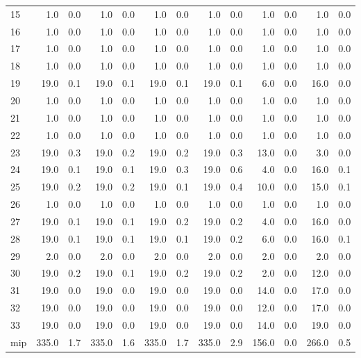\begin{tabular}{lrrrrrrrrrrrr}
     15 &   1.0 &   0.0 &   1.0 &     0.0 &   1.0 &     0.0 &   1.0 &     0.0 &   1.0 &     0.0 &   1.0 &     0.0 \\
     16 &   1.0 &   0.0 &   1.0 &     0.0 &   1.0 &     0.0 &   1.0 &     0.0 &   1.0 &     0.0 &   1.0 &     0.0 \\
     17 &   1.0 &   0.0 &   1.0 &     0.0 &   1.0 &     0.0 &   1.0 &     0.0 &   1.0 &     0.0 &   1.0 &     0.0 \\
     18 &   1.0 &   0.0 &   1.0 &     0.0 &   1.0 &     0.0 &   1.0 &     0.0 &   1.0 &     0.0 &   1.0 &     0.0 \\
     19 &  19.0 &   0.1 &  19.0 &     0.1 &  19.0 &     0.1 &  19.0 &     0.1 &   6.0 &     0.0 &  16.0 &     0.0 \\
     20 &   1.0 &   0.0 &   1.0 &     0.0 &   1.0 &     0.0 &   1.0 &     0.0 &   1.0 &     0.0 &   1.0 &     0.0 \\
     21 &   1.0 &   0.0 &   1.0 &     0.0 &   1.0 &     0.0 &   1.0 &     0.0 &   1.0 &     0.0 &   1.0 &     0.0 \\
     22 &   1.0 &   0.0 &   1.0 &     0.0 &   1.0 &     0.0 &   1.0 &     0.0 &   1.0 &     0.0 &   1.0 &     0.0 \\
     23 &  19.0 &   0.3 &  19.0 &     0.2 &  19.0 &     0.2 &  19.0 &     0.3 &  13.0 &     0.0 &   3.0 &     0.0 \\
     24 &  19.0 &   0.1 &  19.0 &     0.1 &  19.0 &     0.3 &  19.0 &     0.6 &   4.0 &     0.0 &  16.0 &     0.1 \\
     25 &  19.0 &   0.2 &  19.0 &     0.2 &  19.0 &     0.1 &  19.0 &     0.4 &  10.0 &     0.0 &  15.0 &     0.1 \\
     26 &   1.0 &   0.0 &   1.0 &     0.0 &   1.0 &     0.0 &   1.0 &     0.0 &   1.0 &     0.0 &   1.0 &     0.0 \\
     27 &  19.0 &   0.1 &  19.0 &     0.1 &  19.0 &     0.2 &  19.0 &     0.2 &   4.0 &     0.0 &  16.0 &     0.0 \\
     28 &  19.0 &   0.1 &  19.0 &     0.1 &  19.0 &     0.1 &  19.0 &     0.2 &   6.0 &     0.0 &  16.0 &     0.1 \\
     29 &   2.0 &   0.0 &   2.0 &     0.0 &   2.0 &     0.0 &   2.0 &     0.0 &   2.0 &     0.0 &   2.0 &     0.0 \\
     30 &  19.0 &   0.2 &  19.0 &     0.1 &  19.0 &     0.2 &  19.0 &     0.2 &   2.0 &     0.0 &  12.0 &     0.0 \\
     31 &  19.0 &   0.0 &  19.0 &     0.0 &  19.0 &     0.0 &  19.0 &     0.0 &  14.0 &     0.0 &  17.0 &     0.0 \\
     32 &  19.0 &   0.0 &  19.0 &     0.0 &  19.0 &     0.0 &  19.0 &     0.0 &  12.0 &     0.0 &  17.0 &     0.0 \\
     33 &  19.0 &   0.0 &  19.0 &     0.0 &  19.0 &     0.0 &  19.0 &     0.0 &  14.0 &     0.0 &  19.0 &     0.0 \\
    mip & 335.0 &   1.7 & 335.0 &     1.6 & 335.0 &     1.7 & 335.0 &     2.9 & 156.0 &     0.0 & 266.0 &     0.5 \\
\bottomrule
\end{tabular}
